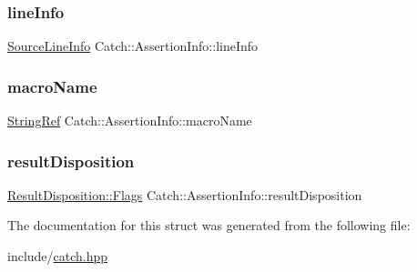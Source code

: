 \mbox{\label{structCatch_1_1AssertionInfo_a17bdbb404ba12658034f833be2f4c3e7}} 
\subsubsection{\texorpdfstring{line\+Info}{lineInfo}}
{\footnotesize\ttfamily \mbox{\hyperlink{structCatch_1_1SourceLineInfo}{Source\+Line\+Info}} Catch\+::\+Assertion\+Info\+::line\+Info}

\mbox{\label{structCatch_1_1AssertionInfo_aaf3fbb9f1fe09c879ba3d877584e3056}} 
\subsubsection{\texorpdfstring{macro\+Name}{macroName}}
{\footnotesize\ttfamily \mbox{\hyperlink{classCatch_1_1StringRef}{String\+Ref}} Catch\+::\+Assertion\+Info\+::macro\+Name}

\mbox{\label{structCatch_1_1AssertionInfo_a60353b3632ab2f827162f2b2d6911073}} 
\subsubsection{\texorpdfstring{result\+Disposition}{resultDisposition}}
{\footnotesize\ttfamily \mbox{\hyperlink{structCatch_1_1ResultDisposition_a3396cad6e2259af326b3aae93e23e9d8}{Result\+Disposition\+::\+Flags}} Catch\+::\+Assertion\+Info\+::result\+Disposition}



The documentation for this struct was generated from the following file\+:\begin{DoxyCompactItemize}
\item 
include/\mbox{\hyperlink{catch_8hpp}{catch.\+hpp}}\end{DoxyCompactItemize}
